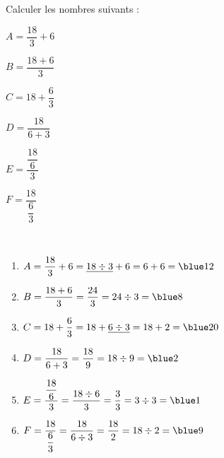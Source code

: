 \begin{exercice} %
   Calculer les nombres suivants :
   \setlength{\columnseprule}{0pt}
   \begin{multicols}{2}
      \begin{list}{}{}
         \item $A=\dfrac{18}{3}+6$
         \item $B=\dfrac{18+6}{3}$         
         \item $C=18+\dfrac{6}{3}$
         \columnbreak         
         \item $D=\dfrac{18}{6+3}$\medskip         
         \item $E=\dfrac{\dfrac{18}{6}}{3}$\medskip
         \item $F=\dfrac{18}{\dfrac{6}{3}}$         
      \end{list}
   \end{multicols}
 \end{exercice}
 
 \begin{corrige}
    \ \\ [-5mm]
    \begin{enumerate}
       \item $A=\dfrac{18}{3}+6 =\underline{18\div3}+6 =6+6 =\blue 12$ \medskip
       \item $B=\dfrac{18+6}{3} =\dfrac{24}{3} =24\div3 =\blue 8$ \medskip
       \item $C=18+\dfrac{6}{3} =18+\underline{6\div3} =18+2 =\blue 20$ \medskip
       \item $D=\dfrac{18}{6+3} =\dfrac{18}{9} =18\div9 =\blue 2$ \medskip
       \item $E=\dfrac{\dfrac{18}{6}}{3} =\dfrac{18\div6}{3} =\dfrac{3}{3} =3\div3 =\blue 1$ \medskip
       \item $F=\dfrac{18}{\dfrac{6}{3}} =\dfrac{18}{6\div3} =\dfrac{18}{2} =18\div2 =\blue 9$
    \end{enumerate}
 \end{corrige}